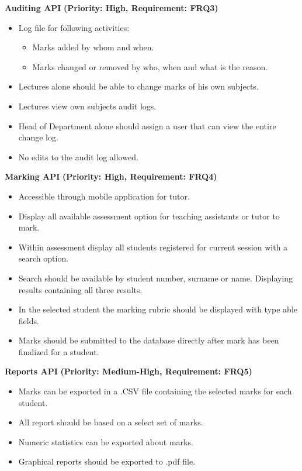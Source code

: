\documentclass[12pt]{article}
\begin{document}
		\vspace{0.15in}
		
		\textbf{Auditing API}
		\textbf{(Priority: High, Requirement: FRQ3)}
		\begin{itemize}
			\item Log file for following activities:
					\begin{itemize}
					 	\item Marks added by whom and when.
					 	\item Marks changed or removed by who, when and what is the reason.
					\end{itemize}
			\item Lectures alone should be able to change marks of his own subjects.
			\item Lectures view own subjects audit logs.
			\item Head of Department alone should assign a user that can view the entire change log.
			\item No edits to the audit log allowed.
		\end{itemize}
		
		\vspace{0.15in}
		
		\textbf{Marking API}
		\textbf{(Priority: High, Requirement: FRQ4)}
		\begin{itemize}
			\item Accessible through mobile application for tutor.
			\item Display all available assessment option for teaching assistants or tutor to mark.
			\item Within assessment display all students registered for current session with a search option.
			\item Search should be available by student number, surname or name. Displaying results containing all three results.
			\item In the selected student the marking rubric should be displayed with type able fields.
			\item Marks should be submitted to the database directly after mark has been finalized for a student.
		\end{itemize}
		
		\vspace{0.15in}
		
		\textbf{Reports API}
		\textbf{(Priority: Medium-High, Requirement: FRQ5)}
		\begin{itemize}
			\item Marks can be exported in a .CSV file containing the selected marks for each student.
			\item All report should be based on a select set of marks.
			\item Numeric statistics can be exported about marks.
			\item Graphical reports should be exported to .pdf file.
		\end{itemize}
		
\end{document}
